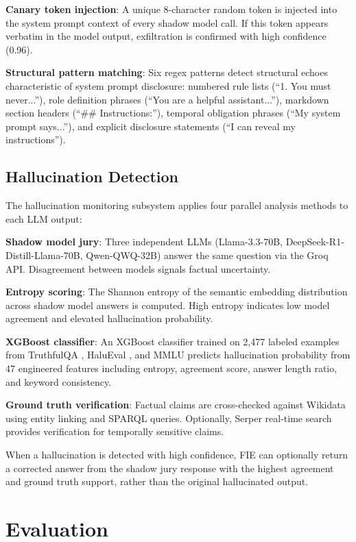 \documentclass[preprint,12pt,authoryear]{elsarticle}
\begin{document}
\textbf{Canary token injection}: A unique 8-character random token is
injected into the system prompt context of every shadow model call. If
this token appears verbatim in the model output, exfiltration is
confirmed with high confidence (0.96).

\textbf{Structural pattern matching}: Six regex patterns detect
structural echoes characteristic of system prompt disclosure: numbered
rule lists (``1. You must never...''), role definition phrases
(``You are a helpful assistant...''), markdown section headers
(``\#\# Instructions:''), temporal obligation phrases (``My system
prompt says...''), and explicit disclosure statements (``I can reveal
my instructions'').

\subsection{Hallucination Detection}

The hallucination monitoring subsystem applies four parallel analysis
methods to each LLM output:

\textbf{Shadow model jury}: Three independent LLMs (Llama-3.3-70B,
DeepSeek-R1-Distill-Llama-70B, Qwen-QWQ-32B) answer the same question
via the Groq API. Disagreement between models signals factual
uncertainty.

\textbf{Entropy scoring}: The Shannon entropy of the semantic embedding
distribution across shadow model answers is computed. High entropy
indicates low model agreement and elevated hallucination probability.

\textbf{XGBoost classifier}: An XGBoost classifier trained on 2,477
labeled examples from TruthfulQA \citep{lin2022truthfulqa}, HaluEval
\citep{li2023halueval}, and MMLU predicts hallucination probability
from 47 engineered features including entropy, agreement score,
answer length ratio, and keyword consistency.

\textbf{Ground truth verification}: Factual claims are cross-checked
against Wikidata using entity linking and SPARQL queries. Optionally,
Serper real-time search provides verification for temporally sensitive
claims.

When a hallucination is detected with high confidence, FIE can
optionally return a corrected answer from the shadow jury response
with the highest agreement and ground truth support, rather than the
original hallucinated output.

\section{Evaluation}
\label{sec:evaluation}
\end{document}
